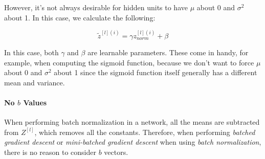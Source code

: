 \documentclass{article}
\begin{document}
However, it's not always desirable for hidden units to have $\mu$ about 0 and $\sigma^2$ about 1.  In this case, we calculate the following:

\begin{equation}
\tilde{z}^{[l](i)} = \gamma z_{norm}^{[l](i)} + \beta
\end{equation}

In this case, both $\gamma$ and $\beta$ are learnable parameters.  These come in handy, for example, when computing the sigmoid function, because we don't want to force $\mu$ about 0 and $\sigma^2$ about 1 since the sigmoid function itself generally has a different mean and variance.

\paragraph{No $b$ Values}

When performing batch normalization in a network, all the means are subtracted from $Z^{[l]}$, which removes all the constants.  Therefore, when performing \textit{batched gradient descent} or \textit{mini-batched gradient descent} when using \textit{batch normalization}, there is no reason to consider $b$ vectors.
\end{document}
